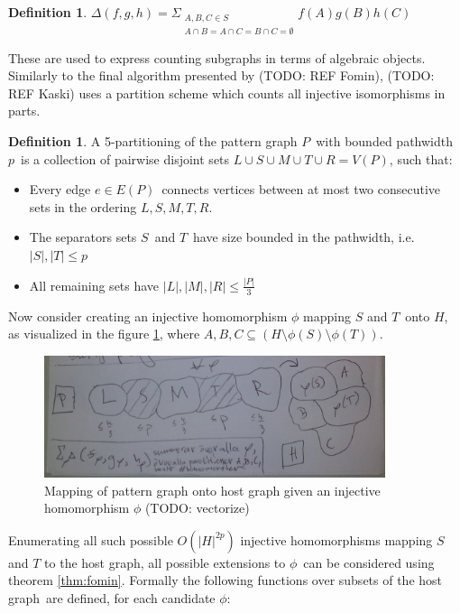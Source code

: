 \documentclass[a4paper,11pt]{report}
\theoremstyle{plain}
\theoremstyle{definition}
\newtheorem{defn}[thm]{Definition} %
\begin{document}
\begin{defn}
$\Delta(f, g, h) = \Sigma_{\substack{A, B, C \in S\\A \cap B = A \cap C = B \cap C = \emptyset}} f(A)g(B)h(C)$
\end{defn}

These are used to express counting subgraphs in terms of algebraic objects.
Similarly to the final algorithm presented by (TODO: REF Fomin), (TODO: REF Kaski) uses a partition scheme which counts all injective isomorphisms in parts.

\begin{defn}
A 5-partitioning of the pattern graph $P$ with bounded pathwidth $p$ is a collection of pairwise disjoint sets $L \cup S \cup M \cup T \cup R = V(P)$, such that:
\begin{itemize}
\item Every edge $e \in E(P)$ connects vertices between at most two consecutive sets in the ordering $L, S, M, T, R$.
\item The separators sets $S$ and $T$ have size bounded in the pathwidth, i.e. $|S|, |T| \leq p$
\item All remaining sets have $|L|, |M|, |R| \leq \frac{|P|}{3}$
\end{itemize}
\end{defn}

Now consider creating an injective homomorphism $\phi$ mapping $S$ and $T$ onto $H$, as visualized in the figure \ref{fig:homo-viz},
where $A,B,C \subseteq (H \setminus \phi(S) \setminus \phi(T))$.

\begin{figure}[here]
\centering
\includegraphics[width=10cm]{images/sketch_homo.png} 
\caption[Mapping]{Mapping of pattern graph onto host graph given an injective homomorphism $\phi$ (TODO: vectorize)}
\label{fig:homo-viz}
\end{figure}

Enumerating all such possible $O(|H|^{2p})$ injective homomorphisms mapping $S$ and $T$ to the host graph,
all possible extensions to $\phi$ can be considered using theorem \ref{thm:fomin}.
Formally the following functions over subsets of the host graph are defined, for each candidate $\phi$:
\end{document}
